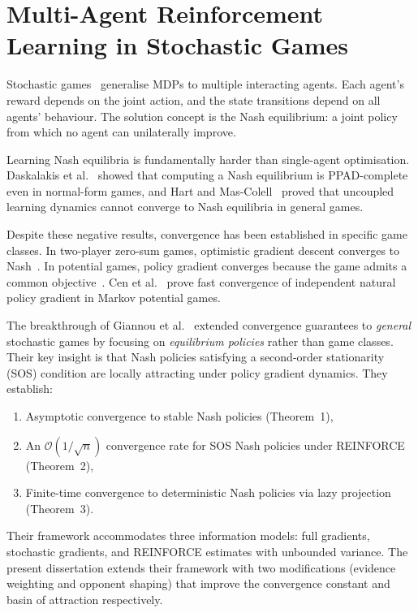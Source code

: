 \section{Multi-Agent Reinforcement Learning in Stochastic Games}
\label{sec:lit-marl}

Stochastic games~\cite{shapley1953} generalise MDPs to multiple interacting agents. Each agent's reward depends on the joint action, and the state transitions depend on all agents' behaviour. The solution concept is the Nash equilibrium: a joint policy from which no agent can unilaterally improve.

Learning Nash equilibria is fundamentally harder than single-agent optimisation. Daskalakis et al.~\cite{daskalakis2009complexity} showed that computing a Nash equilibrium is PPAD-complete even in normal-form games, and Hart and Mas-Colell~\cite{hart2003uncoupled} proved that uncoupled learning dynamics cannot converge to Nash equilibria in general games.

Despite these negative results, convergence has been established in specific game classes. In two-player zero-sum games, optimistic gradient descent converges to Nash~\cite{daskalakis2018training}. In potential games, policy gradient converges because the game admits a common objective~\cite{leonardos2022global}. Cen et al.~\cite{cen2021fast} prove fast convergence of independent natural policy gradient in Markov potential games.

The breakthrough of Giannou et al.~\cite{giannou2022} extended convergence guarantees to \emph{general} stochastic games by focusing on \emph{equilibrium policies} rather than game classes. Their key insight is that Nash policies satisfying a second-order stationarity (SOS) condition are locally attracting under policy gradient dynamics. They establish:
\begin{enumerate}
    \item Asymptotic convergence to stable Nash policies (Theorem~1),
    \item An $\mathcal{O}(1/\sqrt{n})$ convergence rate for SOS Nash policies under REINFORCE (Theorem~2),
    \item Finite-time convergence to deterministic Nash policies via lazy projection (Theorem~3).
\end{enumerate}
Their framework accommodates three information models: full gradients, stochastic gradients, and REINFORCE estimates with unbounded variance. The present dissertation extends their framework with two modifications (evidence weighting and opponent shaping) that improve the convergence constant and basin of attraction respectively.


